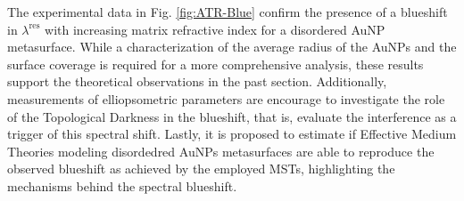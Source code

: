 The experimental data in Fig. \ref{fig:ATR-Blue} confirm the presence of a blueshift in $\lambda^\text{res}$ with increasing matrix refractive index for a disordered AuNP metasurface. While a characterization of the average radius of the AuNPs and the surface coverage is required for a more comprehensive analysis, these results support the theoretical observations in the past section. Additionally, measurements of elliopsometric parameters are encourage to investigate the role of the Topological Darkness  in the blueshift, that is, evaluate the interference as a trigger of this spectral shift. Lastly, it is proposed to estimate if Effective Medium Theories modeling disordedred AuNPs metasurfaces are able to reproduce the observed blueshift as achieved by the employed MSTs, highlighting the mechanisms behind the spectral blueshift.
